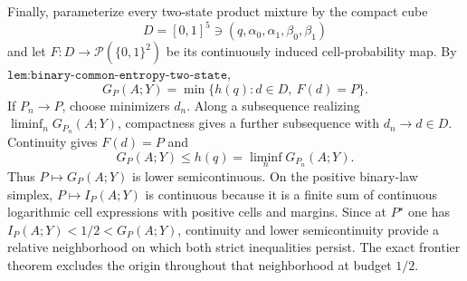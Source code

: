 Finally, parameterize every two-state product mixture by the compact cube
\[
 D=[0,1]^5\ni(q,\alpha_0,\alpha_1,\beta_0,\beta_1)
\]
and let \(F:D\to\mathcal P(\{0,1\}^2)\) be its continuously induced cell-probability map.  By \(\texttt{lem:binary-common-entropy-two-state}\),
\[
 G_P(A;Y)=\min\{h(q):d\in D,\ F(d)=P\}.
\]
If \(P_n\to P\), choose minimizers \(d_n\).  Along a subsequence realizing \(\liminf_nG_{P_n}(A;Y)\), compactness gives a further subsequence with \(d_n\to d\in D\).  Continuity gives \(F(d)=P\) and
\[
 G_P(A;Y)\leq h(q)=\liminf_nG_{P_n}(A;Y).
\]
Thus \(P\mapsto G_P(A;Y)\) is lower semicontinuous.  On the positive binary-law simplex, \(P\mapsto I_P(A;Y)\) is continuous because it is a finite sum of continuous logarithmic cell expressions with positive cells and margins.  Since at \(P^\star\) one has \(I_P(A;Y)<1/2<G_P(A;Y)\), continuity and lower semicontinuity provide a relative neighborhood on which both strict inequalities persist.  The exact frontier theorem excludes the origin throughout that neighborhood at budget \(1/2\).